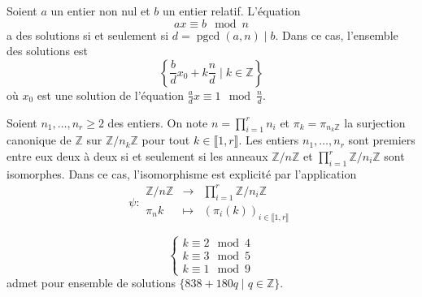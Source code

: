   \begin{corollary}
    Soient $a$ un entier non nul et $b$ un entier relatif. L'équation
    \[ ax \equiv b \mod n \]
    a des solutions si et seulement si $d = \operatorname{pgcd}(a,n) \mid b$. Dans ce cas, l'ensemble des solutions est
    \[ \left\{ \frac{b}{d}x_0 + k\frac{n}{d} \mid k \in \mathbb{Z} \right\} \]
    où $x_0$ est une solution de l'équation $\frac{a}{d}x \equiv 1 \mod \frac{n}{d}$.
  \end{corollary}


  \begin{theorem}
    Soient $n_1, \dots, n_r \geq 2$ des entiers. On note $n = \prod_{i=1}^r n_i$ et $\pi_k = \pi_{{n_k}\mathbb{Z}}$ la surjection canonique de $\mathbb{Z}$ sur $\mathbb{Z}/n_k\mathbb{Z}$ pour tout $k \in \llbracket 1, r \rrbracket$.
    \newpar
    Les entiers $n_1, \dots, n_r$ sont premiers entre eux deux à deux si et seulement si les anneaux $\mathbb{Z}/n\mathbb{Z}$ et $\prod_{i=1}^{r}\mathbb{Z}/n_i\mathbb{Z}$ sont isomorphes. Dans ce cas, l'isomorphisme est explicité par l'application
    \[
    \psi :
    \begin{array}{ccc}
      \mathbb{Z}/n\mathbb{Z} &\rightarrow& \prod_{i=1}^{r}\mathbb{Z}/n_i\mathbb{Z} \\
      \pi_{n}{k} &\mapsto& (\pi_i(k))_{i \in \llbracket 1, r \rrbracket}
    \end{array}
    \]
  \end{theorem}


  \begin{example}
    \[
    \begin{cases}
      k \equiv 2 \mod 4 \\
      k \equiv 3 \mod 5 \\
      k \equiv 1 \mod 9
    \end{cases}
    \]
    admet pour ensemble de solutions $\{ 838+180q \mid q \in \mathbb{Z} \}$.
  \end{example}

